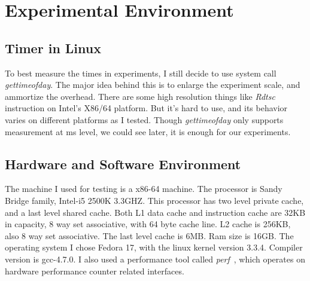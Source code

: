 \section{Experimental Environment}
	\label{sec:timing}
\subsection{Timer in Linux}
To best measure the times in experiments, I still decide to use system call
\emph{gettimeofday}. The major idea behind this is to enlarge the experiment
scale, and ammortize the overhead. There are some high resolution things like
\emph{Rdtsc} instruction on Intel's X86/64 platform. But it's hard to use, and
its behavior varies on different platforms as I tested. Though
\emph{gettimeofday} only supports measurement at ms level, we could see later,
it is enough for our experiments.

\subsection{Hardware and Software Environment}
The machine I used for testing is a x86-64 machine. The processor is Sandy
Bridge family, Intel-i5 2500K 3.3GHZ. This processor has two level private
cache, and a last level shared cache. Both L1 data cache and instruction cache
are 32KB in capacity, 8 way set associative, with 64 byte cache line. L2 cache
is 256KB, also 8 way set associative. The last level cache is 6MB. Ram size is
16GB. The operating system I chose Fedora 17, with the linux kernel version
3.3.4. Compiler version is gcc-4.7.0. I also used a performance tool called
\emph{perf}~\cite{perf}, which operates on hardware performance counter related interfaces.

